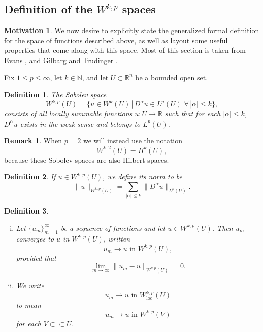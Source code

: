 \documentclass[11pt]{article}
\newtheorem{definition}{Definition}
\theoremstyle{definition}
\newtheorem*{remark}{Remark}
\newtheorem*{motivation}{Motivation}
\begin{document}
\subsection{Definition of the $W^{k,p}$ spaces}
\begin{motivation}
	We now desire to explicitly state the generalized formal definition for the space of functions described above,
	as well as layout some useful properties that come along with this space.
	Most of this section is taken from Evans \cite{evans1998partial}, and Gilbarg and Trudinger \cite{gilbarg2001elliptic}.
\end{motivation}
Fix $1 \leq p \leq \infty$, let $k \in \mathbb{N}$, and let $U \subset \mathbb{R}^n$ be a bounded open set.
\begin{definition}
	The Sobolev space
	\[W^{k,p}(U) = \{u \in W^k(U) \, | \, D^{\alpha}u \in L^p(U) \,\, \forall \, |\alpha| \leq k\},\]
	consists of all locally summable functions $u : U \rightarrow \mathbb{R}$ such that for each $|\alpha| \leq k$, $D^{\alpha}u$ exists in the weak sense
	and belongs to $L^p(U)$.
\end{definition}
\begin{remark}
	When $p=2$ we will instead use the notation
	\[W^{k,2}(U) = H^k(U),\]
	because these Sobolev spaces are also Hilbert spaces.
\end{remark}
\begin{definition}
	If $u \in W^{k,p}(U)$, we define its norm to be
	\[\|u\|_{W^{k,p}(U)} = \sum_{|\alpha| \leq k} \|D^{\alpha}u\|_{L^p(U)}.\]
\end{definition}

\newpage

\begin{definition}~ 
	\begin{enumerate}[(i)]
		\item Let $\{u_m\}_{m = 1}^{\infty}$ be a sequence of functions and let $u \in W^{k,p}(U)$. Then $u_m$ converges to $u$ in $W^{k,p}(U)$, written
			\begin{equation*}
				u_m \rightarrow u \text{ in } W^{k,p}(U),
			\end{equation*}
			provided that
			\begin{equation*}
				\lim_{m \rightarrow \infty}{\|u_m - u\|_{W^{k,p}(U)}} = 0.
			\end{equation*}
		\item We write
			\begin{equation*}
				u_m \rightarrow u \text{ in } W_{\text{loc}}^{k,p}(U)
			\end{equation*}
			to mean
			\begin{equation*}
				u_m \rightarrow u \text{ in } W^{k,p}(V)
			\end{equation*}
			for each $V \subset\subset U$.
	\end{enumerate}
\end{definition}
\end{document}
